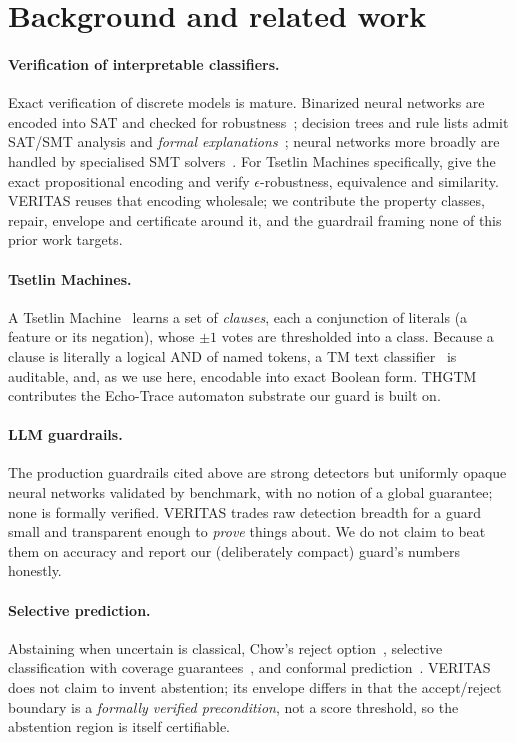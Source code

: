 \documentclass[11pt]{article}
\begin{document}
\section{Background and related work}
\label{sec:related}

\paragraph{Verification of interpretable classifiers.} Exact verification of
discrete models is mature. Binarized neural networks are encoded into SAT and
checked for robustness~\citep{narodytska2018verifying}; decision trees and rule
lists admit SAT/SMT analysis and \emph{formal explanations}~\citep{ignatiev2019abduction};
neural networks more broadly are handled by specialised SMT solvers~\citep{katz2017reluplex}.
For Tsetlin Machines specifically, \citet{przybysz2023verifying} give the exact
propositional encoding and verify $\epsilon$-robustness, equivalence and similarity.
VERITAS reuses that encoding wholesale; we contribute the property classes, repair,
envelope and certificate around it, and the guardrail framing none of this prior
work targets.

\paragraph{Tsetlin Machines.} A Tsetlin Machine~\citep{granmo2018tsetlin} learns a
set of \emph{clauses}, each a conjunction of literals (a feature or its negation),
whose $\pm1$ votes are thresholded into a class. Because a clause is literally a
logical AND of named tokens, a TM text classifier~\citep{yadav2021textunderstanding}
is auditable, and, as we use here, encodable into exact Boolean form. THGTM
\citep{debes2026thgtm} contributes the Echo-Trace automaton substrate our guard is
built on.

\paragraph{LLM guardrails.} The production guardrails cited above are strong
detectors but uniformly opaque neural networks validated by benchmark, with no
notion of a global guarantee; none is formally verified. VERITAS trades raw
detection breadth for a guard small and transparent enough to \emph{prove} things
about. We do not claim to beat them on accuracy and report our (deliberately
compact) guard's numbers honestly.

\paragraph{Selective prediction.} Abstaining when uncertain is classical, Chow's
reject option~\citep{chow1970optimum}, selective classification with coverage
guarantees~\citep{geifman2017selective,elyaniv2010foundations}, and conformal
prediction~\citep{angelopoulos2023conformal}. VERITAS does not claim to invent
abstention; its envelope differs in that the accept/reject boundary is a
\emph{formally verified precondition}, not a score threshold, so the abstention
region is itself certifiable.
\end{document}
